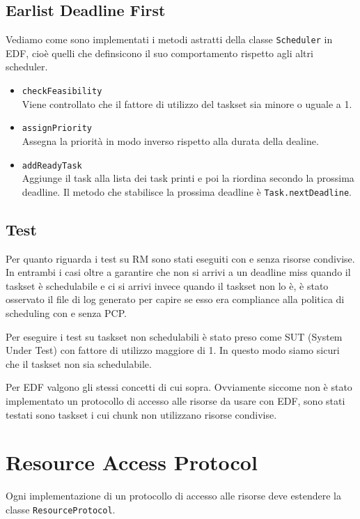 \subsection{Earlist Deadline First}
Vediamo come sono implementati i metodi astratti della classe \texttt{Scheduler} in EDF, cioè quelli che definsicono il suo comportamento rispetto agli altri scheduler.
\begin{itemize}
    \item \texttt{checkFeasibility} \\
        Viene controllato che il fattore di utilizzo del taskset sia minore o uguale a 1.
    \item \texttt{assignPriority} \\
        Assegna la priorità in modo inverso rispetto alla durata della dealine.
    \item \texttt{addReadyTask} \\
        Aggiunge il task alla lista dei task printi e poi la riordina secondo la prossima deadline. Il metodo che stabilisce la prossima deadline è \texttt{Task.nextDeadline}.
\end{itemize}

\subsection{Test}
Per quanto riguarda i test su RM sono stati eseguiti con e senza risorse condivise. In entrambi i casi oltre a garantire che non si arrivi a un deadline miss quando il taskset è schedulabile e ci si arrivi invece quando il taskset non lo è, è stato osservato il file di log generato per capire se esso era compliance alla politica di scheduling con e senza PCP.

Per eseguire i test su taskset non schedulabili è stato preso come SUT (System Under Test) con fattore di utilizzo maggiore di 1. In questo modo siamo sicuri che il taskset non sia schedulabile.

\myskip

Per EDF valgono gli stessi concetti di cui sopra. Ovviamente siccome non è stato implementato un protocollo di accesso alle risorse da usare con EDF, sono stati testati sono taskset i cui chunk non utilizzano risorse condivise.

\section{Resource Access Protocol}
\label{sec:resaccprot}
Ogni implementazione di un protocollo di accesso alle risorse deve estendere la classe \texttt{ResourceProtocol}.


